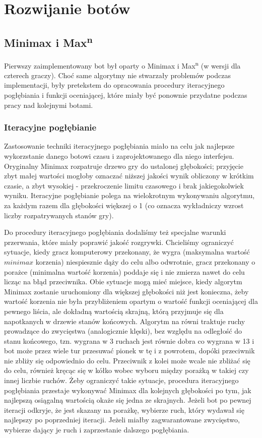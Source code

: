 \documentclass{pracamgr}
\begin{document}
\chapter{Rozwijanie botów}

\section{Minimax i Max\textsuperscript{n}}

Pierwszy zaimplementowany bot był oparty o Minimax i Max\textsuperscript{n} (w wersji dla czterech graczy).
Choć same algorytmy nie stwarzały problemów podczas implementacji, były pretekstem do opracowania procedury iteracyjnego pogłębiania i funkcji oceniającej, które miały być ponownie przydatne podczas pracy nad kolejnymi botami.

\subsection{Iteracyjne pogłębianie}

Zastosowanie techniki iteracyjnego pogłębiania miało na celu jak najlepsze wykorzstanie danego botowi czasu i zaprojektowanego dla niego interfejsu.
Oryginalny Minimax rozpatruje drzewo gry do ustalonej głębokości; przyjęcie zbyt małej wartości mogłoby oznaczać niższej jakości wynik obliczony w krótkim czasie, a zbyt wysokiej - przekroczenie limitu czasowego i brak jakiegokolwiek wyniku.
Iteracyjne pogłębianie polega na wielokrotnym wykonywaniu algorytmu, za każdym razem dla głębokości większej o 1 (co oznacza wykładniczy wzrost liczby rozpatrywanych stanów gry).

Do procedury iteracyjnego pogłębiania dodaliśmy też specjalne warunki przerwania, które miały poprawić jakość rozgrywki.
Chcieliśmy ograniczyć sytuacje, kiedy gracz komputerowy przekonany, że wygra (maksymalna wartość \(minimax\) korzenia) niespiesznie dąży do celu albo odwrotnie, gracz przekonany o porażce (minimalna wartość korzenia) poddaje się i nie zmierza nawet do celu licząc na błąd przeciwnika.
Obie sytuacje mogą mieć miejsce, kiedy algorytm Minimax zostanie uruchomiony dla większej głębokości niż jest konieczna, żeby wartość korzenia nie była przybliżeniem opartym o wartość funkcji oceniającej dla pewnego liścia, ale dokładną wartością skrajną, którą przyjmuje się dla napotkanych w drzewie stanów końcowych.
Algorytm na równi traktuje ruchy prowadzące do zwycięstwa (analogicznie klęski), bez względu na odległość do stanu końcowego, tzn. wygrana w 3 ruchach jest równie dobra co wygrana w 13 i bot może przez wiele tur przesuwać pionek w tę i z powrotem, dopóki przeciwnik nie zbliży się odpowiednio do celu.
Przeciwnik z kolei może wcale nie zbliżać się do celu, również kręcąc się w kółko wobec wyboru między porażką w takiej czy innej liczbie ruchów.
Żeby ograniczyć takie sytuacje, procedura iteracyjnego pogłębiania przestaje wykonywać Minimax dla kolejnych głębokości po tym, jak najlepszą osiągalną wartością okaże się jedna ze skrajnych.
Jeżeli bot po pewnej iteracji odkryje, że jest skazany na porażkę, wybierze ruch, który wydawał się najlepszy po poprzedniej iteracji.
Jeżeli miałby zagwarantowane zwycięstwo, wybierze dający je ruch i zaprzestanie dalszego pogłębiania.
\end{document}
